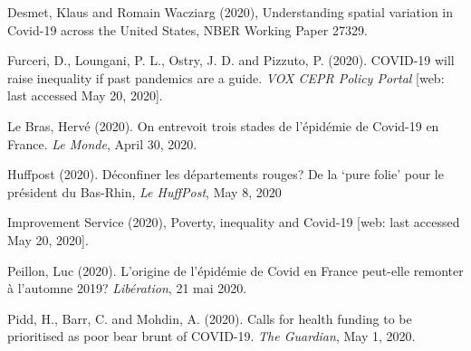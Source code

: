 \documentclass[a4paper]{article}
\theoremstyle{plain}
\theoremstyle{definition}
\begin{document}
\begin {description}

\item Desmet, Klaus and Romain Wacziarg (2020), Understanding spatial variation in Covid-19 across the United States, NBER Working Paper 27329.

\item Furceri, D., Loungani, P. L., Ostry, J. D. and Pizzuto, P. (2020). COVID-19 will raise inequality if past pandemics are a guide.  {\em VOX CEPR Policy Portal} [web: last accessed May 20, 2020].

\item Le Bras, Herv\'e (2020). On entrevoit trois stades de l'\'epid\'emie de Covid-19 en France. {\em Le Monde}, April 30, 2020.

\item Huffpost (2020). D\'econfiner les d\'epartements rouges? De la `pure folie' pour le pr\'esident du Bas-Rhin, {\em Le HuffPost}, May 8, 2020

\item Improvement Service (2020), Poverty, inequality and Covid-19  [web: last accessed May 20, 2020].

\item Peillon, Luc (2020). L'origine de l'\'epid\'emie de Covid en France peut-elle remonter \`a l'automne 2019? {\em Lib\'eration}, 21 mai 2020.

\item Pidd, H., Barr, C. and Mohdin, A. (2020). Calls for health funding to be prioritised as poor bear brunt of COVID-19.  {\em The Guardian}, May 1, 2020.

\end{description}

\newpage
 \begin{figure}[htbp]
\centering
\def\stackalignment{l}
\end{figure} 
\end{document}
